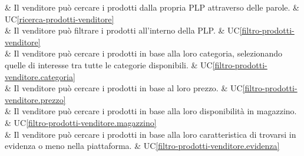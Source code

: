  & Il venditore può cercare i prodotti dalla propria PLP attraverso delle parole. & UC\ref{ricerca-prodotti-venditore} \\

 & Il venditore può filtrare i prodotti all'interno della PLP. & UC\ref{filtro-prodotti-venditore} \\

 & Il venditore può cercare i prodotti in base alla loro categoria, selezionando quelle di interesse tra tutte le categorie disponibili. & UC\ref{filtro-prodotti-venditore.categoria} \\

 & Il venditore può cercare i prodotti in base al loro prezzo. & UC\ref{filtro-prodotti-venditore.prezzo} \\

 & Il venditore può cercare i prodotti in base alla loro disponibilità in magazzino. & UC\ref{filtro-prodotti-venditore.magazzino} \\

 & Il venditore può cercare i prodotti in base alla loro caratteristica di trovarsi in evidenza o meno nella piattaforma. & UC\ref{filtro-prodotti-venditore.evidenza} \\